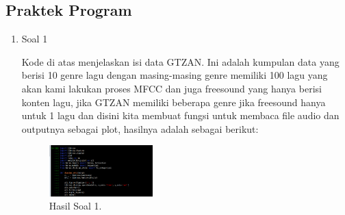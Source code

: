 \subsection{Praktek Program}
\begin{enumerate}
	\item Soal 1
	\hfill\break
	
	Kode di atas menjelaskan isi data GTZAN. Ini adalah kumpulan data yang berisi 10 genre lagu dengan masing-masing genre memiliki 100 lagu yang akan kami lakukan proses MFCC dan juga freesound yang hanya berisi konten lagu, jika GTZAN memiliki beberapa genre jika freesound hanya untuk 1 lagu dan disini kita membuat fungsi untuk membaca file audio dan outputnya sebagai plot, hasilnya adalah sebagai berikut:
	\begin{figure}[H]
	\centering
		\includegraphics[width=4cm]{figures/1174080/6/materi/hasil1.PNG}
		\caption{Hasil Soal 1.}
	\end{figure}


\end{enumerate}
